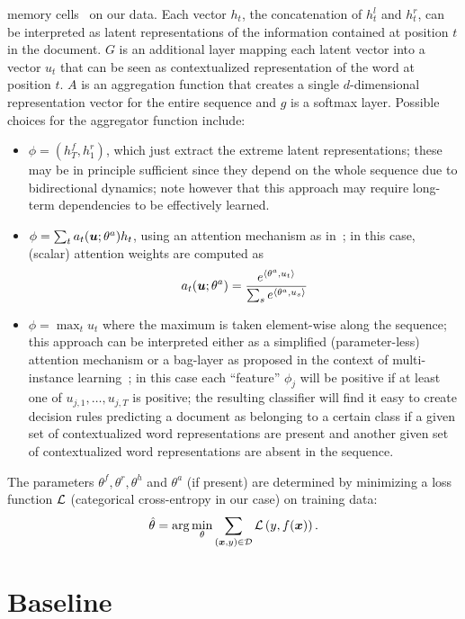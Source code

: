 memory cells~\cite{hochreiter1997long} on our data. Each vector $h_t$,
the concatenation of $h^l_t$ and $h^r_t$, can be interpreted as latent
representations of the information contained at position $t$ in the
document. $G$ is an additional layer mapping each latent vector into a
vector $u_t$ that can be seen as contextualized representation of the
word at position $t$. $A$ is an aggregation function that creates a
single $d$-dimensional representation vector for the entire sequence
and $g$ is a softmax layer. Possible choices for the aggregator
function include:
\begin{itemize}
\item $\phi=(h^f_T,h^r_1)$, which just
  extract the extreme latent representations; these may be in
  principle sufficient since they depend on the whole sequence due to
  bidirectional dynamics; note however that this approach may require
  long-term dependencies to be effectively learned.
\item
  $\phi = \sum_t a_t(\bm{u};\theta^a) h_t$,
  using an attention mechanism as in~\cite{yang_hierarchical_2016}; in
  this case, (scalar) attention weights are computed as
  $$
  a_t(\bm{u};\theta^a) = \frac{e^{\langle \theta^a, u_t\rangle}}
  {\sum_s{e^{\langle \theta^a, u_s\rangle}}}
  $$
\item $\phi = \max_t u_t$ where the maximum is taken element-wise
  along the sequence; this approach can be interpreted either as a
  simplified (parameter-less) attention mechanism or a bag-layer as
  proposed in the context of multi-instance
  learning~\cite{tibo2017network}; in this case each ``feature''
  $\phi_j$ will be positive if at least one of $u_{j,1},\dots,u_{j,T}$
  is positive; the resulting classifier will find it easy to create
  decision rules predicting a document as belonging to a certain class
  if a given set of contextualized word representations are present
  and another given set of contextualized word representations are
  absent in the sequence.
\end{itemize}

The parameters $\theta^f,\theta^r,\theta^h$ and $\theta^a$ (if
present) are determined by minimizing a loss function $\mathcal{L}$
(categorical cross-entropy in our case) on training data:
\begin{equation}
  \hat \theta = \mathrm{arg}\min_\theta\sum_{(\bm{x},y)\in\mathcal{D}}\mathcal{L}\left(y,f(\bm{x})\right).
\end{equation}


\section{Baseline}

